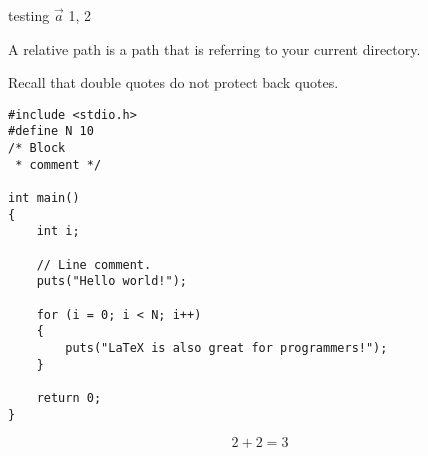 testing $\vec{a}$ 1, 2

\begin{defn}
	A relative path is a path that is referring to your current directory.
\end{defn}

\begin{rem}
	Recall that double quotes do not protect back quotes.
\end{rem}

\begin{lstlisting}[style=Sublime-C++, caption=C++ Example]
#include <stdio.h>
#define N 10
/* Block
 * comment */
 
int main()
{
    int i;
 
    // Line comment.
    puts("Hello world!");
 
    for (i = 0; i < N; i++)
    {
        puts("LaTeX is also great for programmers!");
    }
 
    return 0;
}
\end{lstlisting}

\begin{exmp}
	$$2+2=3$$
\end{exmp}
